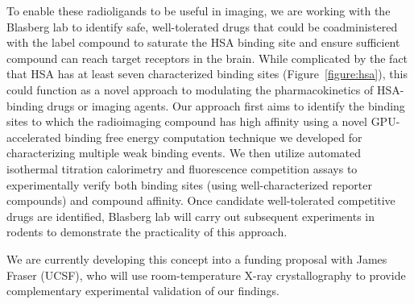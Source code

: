 \documentclass[10pt]{article}
\renewcommand{\baselinestretch}{1.1}
\begin{document}
To enable these radioligands to be useful in imaging, we are working with the Blasberg lab to identify safe, well-tolerated drugs that could be coadministered with the label compound to saturate the HSA binding site and ensure sufficient compound can reach target receptors in the brain.
While complicated by the fact that HSA has at least seven characterized binding sites (Figure~\ref{figure:hsa}), this could function as a novel approach to modulating the pharmacokinetics of HSA-binding drugs or imaging agents.
Our approach first aims to identify the binding sites to which the radioimaging compound has high affinity using a novel GPU-accelerated binding free energy computation technique we developed for characterizing multiple weak binding events.
We then utilize automated isothermal titration calorimetry and fluorescence competition assays to experimentally verify both binding sites (using well-characterized reporter compounds) and compound affinity.
Once candidate well-tolerated competitive drugs are identified, Blasberg lab will carry out subsequent experiments in rodents to demonstrate the practicality of this approach.

We are currently developing this concept into a funding proposal with James Fraser (UCSF), who will use room-temperature X-ray crystallography to provide complementary experimental validation of our findings.


\eject
\footnotesize
\setlength{\parskip}{0em}
\renewcommand{\baselinestretch}{1.0}
 

\end{document}
